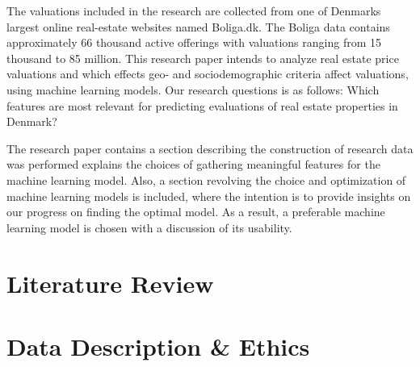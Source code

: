 \documentclass[12pt,a4paper]{article}
\begin{document}
The valuations included in the research are collected from one of Denmarks largest online real-estate websites named Boliga.dk. The Boliga data contains approximately 66 thousand active offerings with valuations ranging from 15 thousand to 85 million. This research paper intends to analyze real estate price valuations and which effects geo- and sociodemographic criteria affect valuations, using machine learning models. Our research questions is as follows: 
Which features are most relevant for predicting evaluations of real estate properties in Denmark?

The research paper contains a section describing the construction of research data was performed explains the choices of gathering meaningful features for the machine learning model. Also, a section revolving the choice and optimization of machine learning models is included, where the intention is to provide insights on our progress on finding the optimal model. As a result, a preferable machine learning model is chosen with a discussion of its usability. 


\section{Literature Review}

\section{Data Description \& Ethics}
\end{document}

